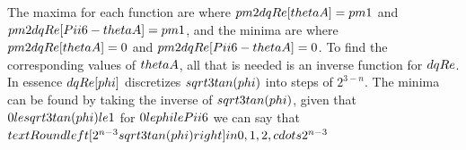 The maxima for each function are where $\\pm 2 \\dqRe[ \\thetaA ]  = \\pm 1$ and $\\pm 2 \\dqRe[ \\Pii{6} -\\thetaA]= \\pm 1$, and the minima are where $\\pm 2 \\dqRe[ \\thetaA ]  = 0$ and $\\pm 2 \\dqRe[ \\Pii{6} -\\thetaA] = 0$. To find the corresponding values of $\\thetaA$, all that is needed is an inverse function for $\\dqRe$. In essence $\\dqRe[\\phi]$ discretizes $\\sqrt{3} \\tan (\\phi )$ into steps of $2^{3-n}$. The minima can be found by taking the inverse of $\\sqrt{3} \\tan (\\phi )$, given that
$0\\le\\sqrt{3} \\tan (\\phi )\\le1$ for $0 \\le \\phi \\le \\Pii{6}$ we can say that $\\text{Round}\\left[ 2^{n-3}\\sqrt{3} \\tan (\\phi ) \\right] \\in \\{ 0, 1, 2, \\cdots 2^{n-3} \\}$ 


